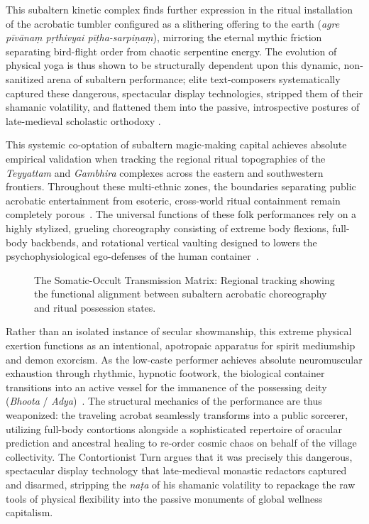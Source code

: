 \documentclass[11pt,twoside,letterpaper]{article}
\begin{document}
This subaltern kinetic complex finds further expression in the ritual installation of the acrobatic tumbler configured as a slithering offering to the earth (\textit{agre pīvānaṃ pṛthivyai pīṭha-sarpiṇaṃ}), mirroring the eternal mythic friction separating bird-flight order from chaotic serpentine energy. The evolution of physical yoga is thus shown to be structurally dependent upon this dynamic, non-sanitized arena of subaltern performance; elite text-composers systematically captured these dangerous, spectacular display technologies, stripped them of their shamanic volatility, and flattened them into the passive, introspective postures of late-medieval scholastic orthodoxy \citep{Birch2024, Mallinson2017, Wujastyk2025}.

This systemic co-optation of subaltern magic-making capital achieves absolute empirical validation when tracking the regional ritual topographies of the \textit{Teyyattam} and \textit{Gambhira} complexes across the eastern and southwestern frontiers. Throughout these multi-ethnic zones, the boundaries separating public acrobatic entertainment from esoteric, cross-world ritual containment remain completely porous~\cite{teyyam1971}. The universal functions of these folk performances rely on a highly stylized, grueling choreography consisting of extreme body flexions, full-body backbends, and rotational vertical vaulting designed to lowers the psychophysiological ego-defenses of the human container~\cite{folklore1972}. 

\begin{figure}[htbp]
\centering
\caption{The Somatic-Occult Transmission Matrix: Regional tracking showing the functional alignment between subaltern acrobatic choreography and ritual possession states.}
\label{fig:somatic_matrix}
\end{figure}

Rather than an isolated instance of secular showmanship, this extreme physical exertion functions as an intentional, apotropaic apparatus for spirit mediumship and demon exorcism. As the low-caste performer achieves absolute neuromuscular exhaustion through rhythmic, hypnotic footwork, the biological container transitions into an active vessel for the immanence of the possessing deity (\textit{Bhoota} / \textit{Adya})~\cite{teyyam1971, folklore1972}. The structural mechanics of the performance are thus weaponized: the traveling acrobat seamlessly transforms into a public sorcerer, utilizing full-body contortions alongside a sophisticated repertoire of oracular prediction and ancestral healing to re-order cosmic chaos on behalf of the village collectivity. The Contortionist Turn argues that it was precisely this dangerous, spectacular display technology that late-medieval monastic redactors captured and disarmed, stripping the \textit{naṭa} of his shamanic volatility to repackage the raw tools of physical flexibility into the passive monuments of global wellness capitalism.
\end{document}
